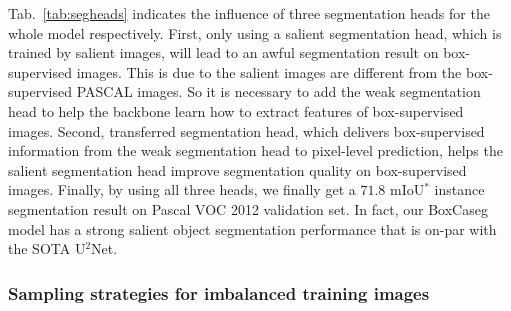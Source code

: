 \documentclass[final]{cvpr}
\begin{document}
Tab.~\ref{tab:segheads} indicates the influence of three segmentation heads for the whole model respectively. First, only using a salient segmentation head, which is trained by salient images, will lead to an awful segmentation result on box-supervised images. This is due to the salient images are different from the box-supervised PASCAL images. So it is necessary to add the weak segmentation head to help the backbone learn how to extract features of box-supervised images. Second, transferred segmentation head, which delivers box-supervised information from the weak segmentation head to pixel-level prediction, helps the salient segmentation head improve segmentation quality on box-supervised images. Finally, by using all three heads, we finally get a $71.8$ mIoU$^{*}$ instance segmentation result on Pascal VOC 2012 validation set. In fact, our BoxCaseg model has a strong salient object segmentation performance that is on-par with the SOTA U$^2$Net\cite{qin2020u2}.





\begin{table}[htbp]
    \caption{Results on PASCAL val when using different segmentation heads. Weak, Salient, and Trans denote the weak, salient, and transferred segmentation heads respectively. If only Trans or Salient is checked, $\alpha$ in Eq.~\eqref{eq:pix} is set to $0$ or $1$.}
    \centering
    \label{tab:segheads}
\end{table}

\vspace{-3mm}
\subsubsection{Sampling strategies for imbalanced training images}
\vspace{-1mm}
\end{document}
